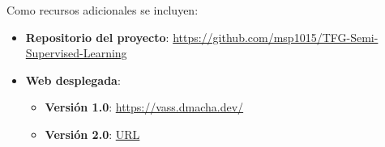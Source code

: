Como recursos adicionales se incluyen:
\begin{itemize}
	\item \textbf{Repositorio del proyecto}: \url{https://github.com/msp1015/TFG-Semi-Supervised-Learning}
	\item \textbf{Web desplegada}: 
	\begin{itemize}
		\item \textbf{Versión 1.0}: \url{https://vass.dmacha.dev/}
		\item \textbf{Versión 2.0}: \url{URL}
	\end{itemize}
\end{itemize}